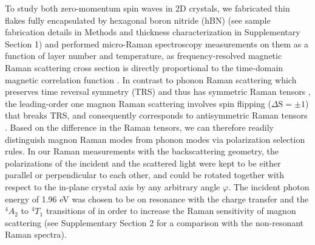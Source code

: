\documentclass[prl, preprint, superscriptaddress]{revtex4-1}
\begin{document}
To study both zero-momentum spin waves in 2D  crystals, we fabricated  thin flakes fully encapsulated by hexagonal boron nitride (hBN) (see sample fabrication details in Methods and thickness characterization in Supplementary Section 1) and performed micro-Raman spectroscopy measurements on them as a function of layer number and temperature, as frequency-resolved magnetic Raman scattering cross section is directly proportional to the time-domain magnetic correlation function \cite{Cooper2011}. In contrast to phonon Raman scattering which preserves time reversal symmetry (TRS) and thus has symmetric Raman tensors \cite{Loudon1964}, the leading-order one magnon Raman scattering involves spin flipping ($\Delta\mathrm{S}=\pm1$) that breaks TRS, and consequently corresponds to antisymmetric Raman tensors \cite{Fleury1968, Wettling1975}. Based on the difference in the Raman tensors, we can therefore readily distinguish magnon Raman modes from phonon modes via polarization selection rules. In our Raman measurements with the backscattering geometry, the polarizations of the incident and the scattered light were kept to be either parallel or perpendicular to each other, and could be rotated together with respect to the in-plane crystal axis by any arbitrary angle $\varphi$. The incident photon energy of 1.96 eV was chosen to be on resonance with the charge transfer and the  $^4A_2$ to $^4T_1$ transitions of  in order to increase the Raman sensitivity of magnon scattering \cite{Seyler2018} (see Supplementary Section 2 for a comparison with the non-resonant Raman spectra).
\end{document}
